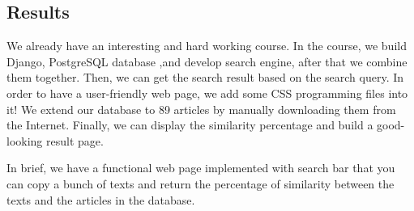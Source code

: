 
\subsection{Results}
We already have an interesting and hard working course. In the course, we build Django, PostgreSQL database ,and develop search engine, after that we combine them together. Then, we can get the search result based on the search query. In order to have a user-friendly web page, we add some CSS programming files into it! We extend our database to 89 articles by manually downloading them from the Internet. Finally, we can display the similarity percentage and build a good-looking result page.

In brief, we have a functional web page implemented with search bar that you can copy a bunch of texts and return the percentage of similarity between the texts and the articles in the database.
